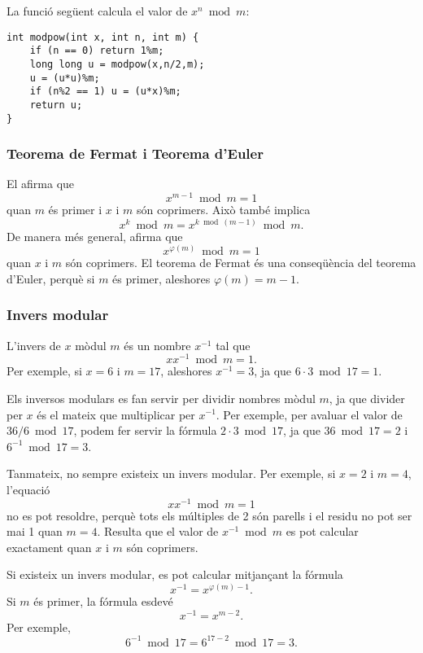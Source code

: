 La funció següent calcula el valor de $x^n \bmod m$:


\begin{lstlisting}
int modpow(int x, int n, int m) {
    if (n == 0) return 1%m;
    long long u = modpow(x,n/2,m);
    u = (u*u)%m;
    if (n%2 == 1) u = (u*x)%m;
    return u;
}
\end{lstlisting}


\subsubsection{Teorema de Fermat i Teorema d'Euler}

 

El  %
afirma que
\[x^{m-1} \bmod m = 1\]
quan $m$ és primer i $x$ i $m$ són coprimers. Això també implica
\[x^k \bmod m = x^{k \bmod (m-1)} \bmod m.\]
De manera més general,  %
afirma que
\[x^{\varphi(m)} \bmod m = 1\]
quan $x$ i $m$ són coprimers. El teorema de Fermat és una conseqüència del
teorema d'Euler, perquè si $m$ és primer, aleshores $\varphi(m)=m-1$.

\subsubsection{Invers modular}


L'invers de $x$ mòdul $m$ és un nombre $x^{-1}$ tal que
\[ x x^{-1} \bmod m = 1. \]
Per exemple, si $x=6$ i $m=17$, aleshores $x^{-1}=3$, ja que $6\cdot3 \bmod 17=1$.

Els inversos modulars es fan servir per dividir nombres mòdul $m$, ja
que divider per $x$ és el mateix que multiplicar per $x^{-1}$. Per
exemple, per avaluar el valor de $36/6 \bmod 17$, podem fer servir la
fórmula $2 \cdot 3 \bmod 17$, ja que $36 \bmod 17 = 2$ i $6^{-1} \bmod
17 = 3 $.

Tanmateix, no sempre existeix un invers modular. Per exemple, si $x=2$
i $m=4$, l'equació
\[ x x^{-1} \bmod m = 1 \]
no es pot resoldre, perquè tots els múltiples de 2 són parells i el
residu no pot ser mai 1 quan $m=4$. Resulta que el valor de
$x^{-1} \bmod m$ es pot calcular exactament quan $x$ i $m$ són coprimers.

Si existeix un invers modular, es pot calcular mitjançant la fórmula
\[
x^{-1} = x^{\varphi(m)-1}.
\]
Si $m$ és primer, la fórmula esdevé
\[
x^{-1} = x^{m-2}.
\]
Per exemple,
\[6^{-1} \bmod 17 =6^{17-2} \bmod 17 = 3.\]


